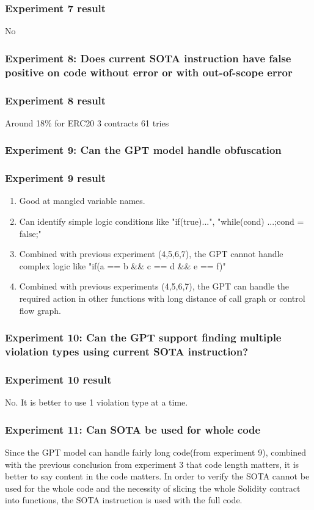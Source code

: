 \subsubsection{ Experiment 7 result }
No

\subsubsection{ Experiment 8: Does current SOTA instruction have false positive on code without error or with out-of-scope error  }
\subsubsection{ Experiment 8 result }
Around 18\% for ERC20 3 contracts 61 tries

\subsubsection{ Experiment 9: Can the GPT model handle obfuscation }
\subsubsection{ Experiment 9 result }
\begin{enumerate}
\item Good at mangled variable names.
\item Can identify simple logic conditions like "if(true){...}", "while(cond){ ...;cond = false;}"
\item Combined with previous experiment (4,5,6,7), the GPT cannot handle complex logic like "if(a == b \&\& c == d \&\& e == f)"
\item Combined with previous experiments (4,5,6,7), the GPT can handle the required action in other functions with long distance of call graph or control flow graph.
\end{enumerate}

\subsubsection{ Experiment 10: Can the GPT support finding multiple violation types using current SOTA instruction? }
\subsubsection{ Experiment 10 result }
No. It is better to use 1 violation type at a time.

\subsubsection{ Experiment 11: Can SOTA be used for whole code }
Since the GPT model can handle fairly long code(from experiment 9), combined with the previous conclusion from experiment 3 that code length matters, it is better to say content in the code matters. 
In order to verify the SOTA cannot be used for the whole code and the necessity of slicing the whole Solidity contract into functions, the SOTA instruction is used with the full code.
